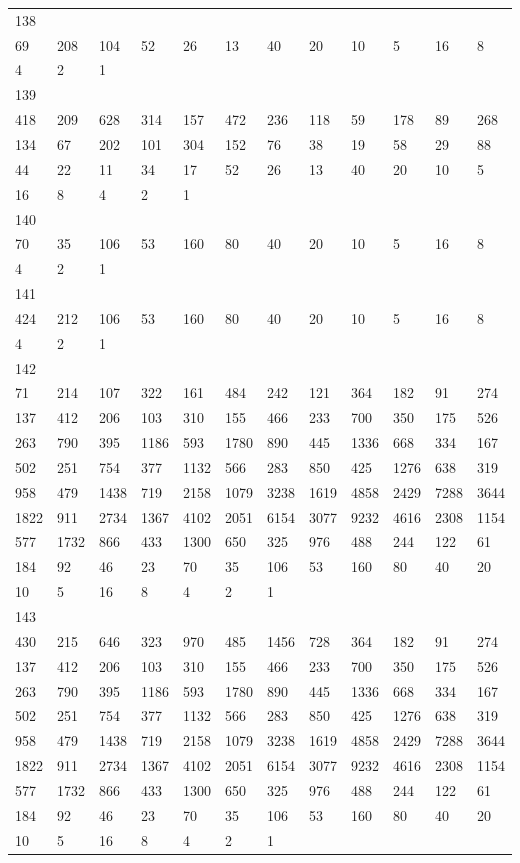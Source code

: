 \begin{longtable}{llllllllllll}
138&&&&&&&&&&&\\
69& 208& 104& 52& 26& 13& 40& 20& 10& 5& 16& 8\\
4& 2& 1& \\

139&&&&&&&&&&&\\
418& 209& 628& 314& 157& 472& 236& 118& 59& 178& 89& 268\\
134& 67& 202& 101& 304& 152& 76& 38& 19& 58& 29& 88\\
44& 22& 11& 34& 17& 52& 26& 13& 40& 20& 10& 5\\
16& 8& 4& 2& 1& \\

140&&&&&&&&&&&\\
70& 35& 106& 53& 160& 80& 40& 20& 10& 5& 16& 8\\
4& 2& 1& \\

141&&&&&&&&&&&\\
424& 212& 106& 53& 160& 80& 40& 20& 10& 5& 16& 8\\
4& 2& 1& \\

142&&&&&&&&&&&\\
71& 214& 107& 322& 161& 484& 242& 121& 364& 182& 91& 274\\
137& 412& 206& 103& 310& 155& 466& 233& 700& 350& 175& 526\\
263& 790& 395& 1186& 593& 1780& 890& 445& 1336& 668& 334& 167\\
502& 251& 754& 377& 1132& 566& 283& 850& 425& 1276& 638& 319\\
958& 479& 1438& 719& 2158& 1079& 3238& 1619& 4858& 2429& 7288& 3644\\
1822& 911& 2734& 1367& 4102& 2051& 6154& 3077& 9232& 4616& 2308& 1154\\
577& 1732& 866& 433& 1300& 650& 325& 976& 488& 244& 122& 61\\
184& 92& 46& 23& 70& 35& 106& 53& 160& 80& 40& 20\\
10& 5& 16& 8& 4& 2& 1& \\

143&&&&&&&&&&&\\
430& 215& 646& 323& 970& 485& 1456& 728& 364& 182& 91& 274\\
137& 412& 206& 103& 310& 155& 466& 233& 700& 350& 175& 526\\
263& 790& 395& 1186& 593& 1780& 890& 445& 1336& 668& 334& 167\\
502& 251& 754& 377& 1132& 566& 283& 850& 425& 1276& 638& 319\\
958& 479& 1438& 719& 2158& 1079& 3238& 1619& 4858& 2429& 7288& 3644\\
1822& 911& 2734& 1367& 4102& 2051& 6154& 3077& 9232& 4616& 2308& 1154\\
577& 1732& 866& 433& 1300& 650& 325& 976& 488& 244& 122& 61\\
184& 92& 46& 23& 70& 35& 106& 53& 160& 80& 40& 20\\
10& 5& 16& 8& 4& 2& 1& \\


\end{longtable}
